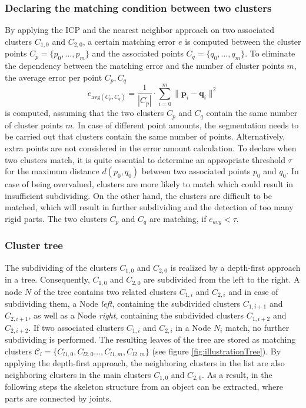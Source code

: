 \documentclass[notitlepage,english]{hgbreport}
\begin{document}
	\subsubsection{Declaring the matching condition between two clusters}
	
	By applying the ICP and the nearest neighbor approach on two associated clusters $C_{1,0}$ and $C_{2,0}$, a certain matching error $e$ is computed between the cluster points $ C_p =  \{ p_0, \ldots, p_m\}$ and the associated points $ C_q =  \{ q_0, \ldots, q_m\}$. To eliminate the dependency between the matching error and the number of cluster points $m$, the average error per point $C_p, C_q$
	\begin{equation}
	e_{\mathrm{avg}(C_p, C_q)} = \frac{1}{| C_p |} \cdot \displaystyle\sum_{i=0}^{m}\| \boldsymbol{p}_i - \boldsymbol{q}_i\|^2
	\end{equation}
	is computed, assuming that the two clusters $C_p$ and $C_q$ contain the same number of cluster points $m$. In case of different point amounts, the segmentation needs to be carried out that clusters contain the same number of points. Alternatively, extra points are not considered in the error amount calculation. To declare when two clusters match, it is quite essential to determine an appropriate threshold $\tau$ for the maximum distance $d(p_0, q_0)$ between two associated points $p_0$ and $q_0$. In case of being overvalued, clusters are more likely to match which could result in insufficient subdividing. On the other hand, the clusters are difficult to be matched, which will result in further subdividing and the detection of too many rigid parts. The two clusters $C_p$ and $C_q$ are matching, if $e_{avg} < \tau$.
	
	\subsubsection{Cluster tree}
	\label{tree}
	
	The subdividing of the clusters $C_{1,0}$ and $C_{2,0}$ is realized by a depth-first approach in a tree. Consequently, $C_{1,0}$ and $C_{2,0}$ are subdivided from the left to the right. A node $N$ of the tree contains two related clusters $C_{1,i}$ and $C_{2,i}$ and in case of subdividing them, a Node \textit{left}, containing the subdivided clusters $C_{1,i+1}$ and $C_{2,i+1}$, as well as a Node \textit{right}, containing the subdivided clusters $C_{1,i+2}$ and $C_{2,i+2}$. If two associated clusters $C_{1,i}$ and $C_{2,i}$ in a Node $N_i$ match, no further subdividing is performed. The resulting leaves of the tree are stored as matching clusters $\mathcal{C}_l = \{C_{l1,0},C_{l2,0}\ldots,C_{l1,m},C_{l2,m}\}$ (see figure \ref{fig:illustrationTree}). By applying the depth-first approach, the neighboring clusters in the list are also neighboring clusters in the main clusters $C_{1,0}$ and $C_{2,0}$.  As a result, in the following steps the skeleton structure from an object can be extracted, where parts are connected by joints.
	
\end{document}
